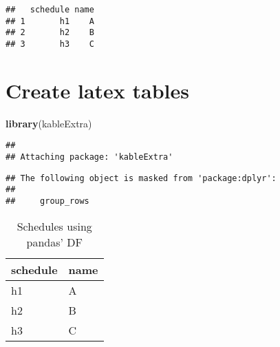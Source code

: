\documentclass[
]{article}
\newenvironment{Shaded}{\begin{snugshade}}{\end{snugshade}}
\newcommand{\DataTypeTok}[1]{\textcolor[rgb]{0.13,0.29,0.53}{#1}}
\newcommand{\KeywordTok}[1]{\textcolor[rgb]{0.13,0.29,0.53}{\textbf{#1}}}
\newcommand{\NormalTok}[1]{#1}
\newcommand{\OperatorTok}[1]{\textcolor[rgb]{0.81,0.36,0.00}{\textbf{#1}}}
\newcommand{\StringTok}[1]{\textcolor[rgb]{0.31,0.60,0.02}{#1}}
\begin{document}
\begin{verbatim}
##   schedule name
## 1       h1    A
## 2       h2    B
## 3       h3    C
\end{verbatim}

\hypertarget{create-latex-tables}{%
\section{Create latex tables}\label{create-latex-tables}}

\begin{Shaded}
\begin{Highlighting}[]
\KeywordTok{library}\NormalTok{(kableExtra)}
\end{Highlighting}
\end{Shaded}

\begin{verbatim}
## 
## Attaching package: 'kableExtra'
\end{verbatim}

\begin{verbatim}
## The following object is masked from 'package:dplyr':
## 
##     group_rows
\end{verbatim}

\begin{Shaded}
\end{Shaded}

\begin{table}

\caption{\label{tab:unnamed-chunk-4}Schedules using pandas' DF}
\centering
\begin{tabular}[t]{ll}
\toprule
schedule & name\\
\midrule
h1 & A\\
h2 & B\\
h3 & C\\
\bottomrule
\end{tabular}
\end{table}
\end{document}
